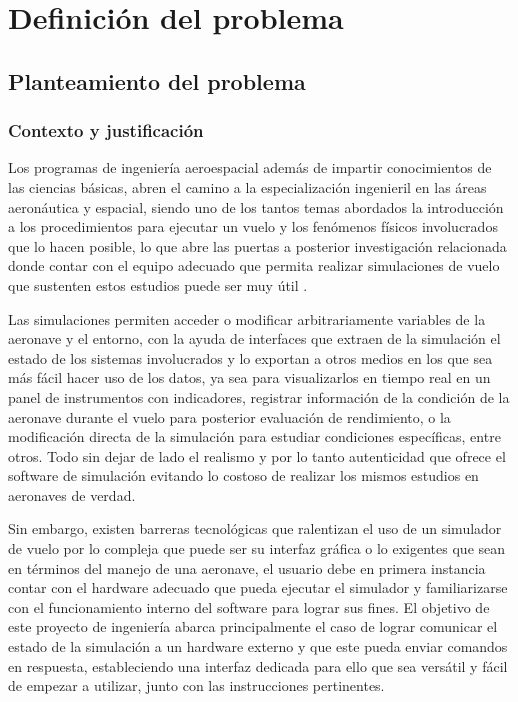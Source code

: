 \chapter{Definición del problema}

\section{Planteamiento del problema}

\subsection{Contexto y justificación}

Los programas de ingeniería aeroespacial además de impartir conocimientos de las ciencias básicas, abren el camino a la especialización ingenieril en las áreas aeronáutica y espacial, siendo uno de los tantos temas abordados la introducción a los procedimientos para ejecutar un vuelo y los fenómenos físicos involucrados que lo hacen posible, lo que abre las puertas a posterior investigación relacionada donde contar con el equipo adecuado que permita realizar simulaciones de vuelo que sustenten estos estudios puede ser muy útil \cite{fsacademia}.

Las simulaciones permiten acceder o modificar arbitrariamente variables de la aeronave y el entorno, con la ayuda de interfaces que extraen de la simulación el estado de los sistemas involucrados y lo exportan a otros medios en los que sea más fácil hacer uso de los datos, ya sea para visualizarlos en tiempo real en un panel de instrumentos con indicadores, registrar información de la condición de la aeronave durante el vuelo para posterior evaluación de rendimiento, o la modificación directa de la simulación para estudiar condiciones específicas, entre otros. Todo sin dejar de lado el realismo y por lo tanto autenticidad que ofrece el software de simulación evitando lo costoso de realizar los mismos estudios en aeronaves de verdad.

Sin embargo, existen barreras tecnológicas que ralentizan el uso de un simulador de vuelo por lo compleja que puede ser su interfaz gráfica o lo exigentes que sean en términos del manejo de una aeronave, el usuario debe en primera instancia contar con el hardware adecuado que pueda ejecutar el simulador y familiarizarse con el funcionamiento interno del software para lograr sus fines. El objetivo de este proyecto de ingeniería abarca principalmente el caso de lograr comunicar el estado de la simulación a un hardware externo y que este pueda enviar comandos en respuesta, estableciendo una interfaz dedicada para ello que sea versátil y fácil de empezar a utilizar, junto con las instrucciones pertinentes.

